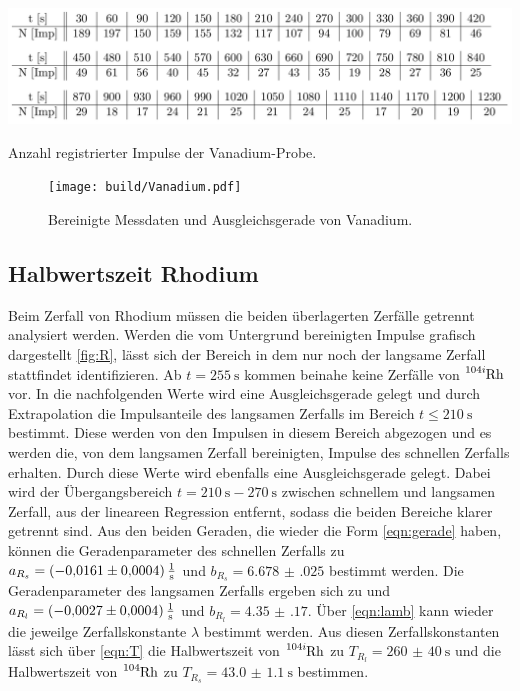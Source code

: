 \begin{table}
\centering
\includegraphics[width=\textwidth]{data/Vanadium.png}
\caption{Anzahl registrierter Impulse der Vanadium-Probe.}
\label{tab:V}
\end{table}

\begin{figure}
\centering
\texttt{[image: build/Vanadium.pdf]}
\caption{Bereinigte Messdaten und Ausgleichsgerade von Vanadium.}
\label{fig:V}
\end{figure}

\subsection{Halbwertszeit Rhodium}
\label{Rhodium}
Beim Zerfall von Rhodium müssen die beiden überlagerten Zerfälle getrennt analysiert werden. Werden die vom Untergrund bereinigten Impulse grafisch dargestellt \ref{fig:R}, lässt sich der Bereich in dem nur noch der langsame Zerfall stattfindet identifizieren. Ab $t=\SI{255}{\s}$ kommen beinahe keine Zerfälle von $\ce{^{104i}Rh}$ vor. In die nachfolgenden Werte wird eine Ausgleichsgerade gelegt und durch Extrapolation die Impulsanteile des langsamen Zerfalls im Bereich $t\leq\SI{210}{\s}$ bestimmt. Diese werden von den Impulsen in diesem Bereich abgezogen und es werden die, von dem langsamen Zerfall bereinigten, Impulse des schnellen Zerfalls erhalten. Durch diese Werte wird ebenfalls eine Ausgleichsgerade gelegt. Dabei wird der Übergangsbereich $t=\SI{210}{\s}-\SI{270}{\s}$ zwischen schnellem und langsamen Zerfall, aus der lineareen Regression entfernt, sodass die beiden Bereiche klarer getrennt sind. Aus den beiden Geraden, die wieder die Form \eqref{eqn:gerade} haben, können die Geradenparameter des schnellen Zerfalls zu $a_{R_s}=\SI{-0.0161(0004)}{\frac{1}{\s}}$ und $b_{R_s}=\num{6.678(025)}$ bestimmt werden. Die Geradenparameter des langsamen Zerfalls ergeben sich zu und $a_{R_l}=\SI{-0.0027(0004)}{\frac{1}{\s}}$ und $b_{R_l}=\num{4.35(17)}$. Über \eqref{eqn:lamb} kann wieder die jeweilge Zerfallskonstante $\lambda$ bestimmt werden. Aus diesen Zerfallskonstanten lässt sich über \eqref{eqn:T} die Halbwertszeit von $\ce{^{104i}Rh}$ zu $T_{R_l}=\SI{260(40)}{\s}$ und die Halbwertszeit von $\ce{^{104}Rh}$ zu $T_{R_s}=\SI{43.0(11)}{\s}$ bestimmen.



